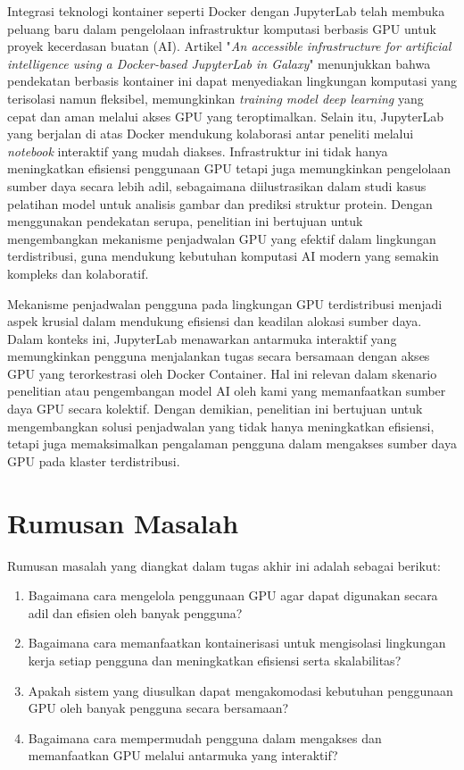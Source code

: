 Integrasi teknologi kontainer seperti Docker dengan JupyterLab telah membuka peluang baru dalam pengelolaan infrastruktur komputasi berbasis GPU untuk proyek kecerdasan buatan (AI). Artikel "\emph{An accessible infrastructure for artificial intelligence using a Docker-based JupyterLab in Galaxy}" menunjukkan bahwa pendekatan berbasis kontainer ini dapat menyediakan lingkungan komputasi yang terisolasi namun fleksibel, memungkinkan \emph{training model deep learning} yang cepat dan aman melalui akses GPU yang teroptimalkan. Selain itu, JupyterLab yang berjalan di atas Docker mendukung kolaborasi antar peneliti melalui \textit{notebook} interaktif yang mudah diakses. Infrastruktur ini tidak hanya meningkatkan efisiensi penggunaan GPU tetapi juga memungkinkan pengelolaan sumber daya secara lebih adil, sebagaimana diilustrasikan dalam studi kasus pelatihan model untuk analisis gambar dan prediksi struktur protein. Dengan menggunakan pendekatan serupa, penelitian ini bertujuan untuk mengembangkan mekanisme penjadwalan GPU yang efektif dalam lingkungan terdistribusi, guna mendukung kebutuhan komputasi AI modern yang semakin kompleks dan kolaboratif.

Mekanisme penjadwalan pengguna pada lingkungan GPU terdistribusi menjadi aspek krusial dalam mendukung efisiensi dan keadilan alokasi sumber daya. Dalam konteks ini, JupyterLab menawarkan antarmuka interaktif yang memungkinkan pengguna menjalankan tugas secara bersamaan dengan akses GPU yang terorkestrasi oleh Docker Container. Hal ini relevan dalam skenario penelitian atau pengembangan model AI oleh kami yang memanfaatkan sumber daya GPU secara kolektif. Dengan demikian, penelitian ini bertujuan untuk mengembangkan solusi penjadwalan yang tidak hanya meningkatkan efisiensi, tetapi juga memaksimalkan pengalaman pengguna dalam mengakses sumber daya GPU pada klaster terdistribusi.

\vspace{2ex}

\section{Rumusan Masalah}
Rumusan masalah yang diangkat dalam tugas akhir ini adalah sebagai berikut:
\begin{enumerate}
    \item Bagaimana cara mengelola penggunaan GPU agar dapat digunakan secara adil dan efisien oleh banyak pengguna?
    \item Bagaimana cara memanfaatkan kontainerisasi untuk mengisolasi lingkungan kerja setiap pengguna dan meningkatkan efisiensi serta skalabilitas?
    \item Apakah sistem yang diusulkan dapat mengakomodasi kebutuhan penggunaan GPU oleh banyak pengguna secara bersamaan?
    \item Bagaimana cara mempermudah pengguna dalam mengakses dan memanfaatkan GPU melalui antarmuka yang interaktif?
\end{enumerate}

